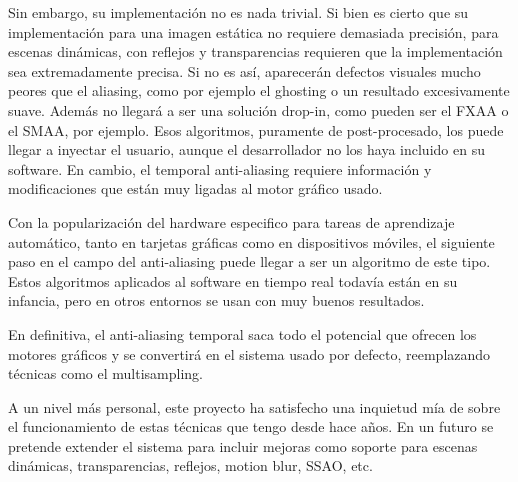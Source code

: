 \documentclass[withindex, glossary]{cam-thesis}
\begin{document}
Sin embargo, su implementación no es nada trivial. Si bien es cierto que su implementación para una imagen estática no requiere demasiada precisión, para escenas dinámicas, con reflejos y transparencias requieren que la implementación sea extremadamente precisa. Si no es así, aparecerán defectos visuales mucho peores que el aliasing, como por ejemplo el ghosting o un resultado excesivamente suave. Además no llegará a ser una solución drop-in, como pueden ser el FXAA o el SMAA, por ejemplo. Esos algoritmos, puramente de post-procesado, los puede llegar a inyectar el usuario, aunque el desarrollador no los haya incluido en su software. En cambio, el temporal anti-aliasing requiere información y modificaciones que están muy ligadas al motor gráfico usado.

Con la popularización del hardware especifico para tareas de aprendizaje automático, tanto en tarjetas gráficas como en dispositivos móviles, el siguiente paso en el campo del anti-aliasing puede llegar a ser un algoritmo de este tipo. Estos algoritmos aplicados al software en tiempo real todavía están en su infancia, pero en otros entornos se usan con muy buenos resultados.

En definitiva, el anti-aliasing temporal saca todo el potencial que ofrecen los motores gráficos y se convertirá en el sistema usado por defecto, reemplazando técnicas como el multisampling.

A un nivel más personal, este proyecto ha satisfecho una inquietud mía de sobre el funcionamiento de estas técnicas que tengo desde hace años. En un futuro se pretende extender el sistema para incluir mejoras como soporte para escenas dinámicas, transparencias, reflejos, motion blur, \Gls{SSAO}, etc.

\nocite{*}
\printbibliography{}

\listoffigures

\printthesisindex{}
\end{document}
